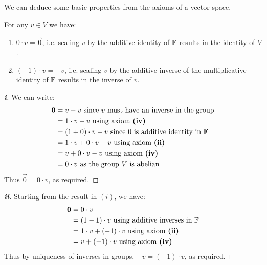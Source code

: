 \documentclass[../main.tex]{subfiles}
\begin{document}
We can deduce some basic properties from the axioms of a vector space.
\begin{proposition}
  For any $v \in V$ we have:
  \begin{enumerate}
    \item $0 \cdot v = \vec{0}$, i.e. scaling $v$ by the additive identity of $\mathbb{F}$ results in the identity of $V$.
    \item $(-1) \cdot v = -v$, i.e. scaling $v$ by the additive inverse of the multiplicative identity of $\mathbb{F}$ results in the inverse of $v$.
  \end{enumerate}
\end{proposition}
\begin{proof}[\textbf{i}]
  We can write:
  \begin{align*}
    \mathbf{\bm{0}} &= v - v \text{ since $v$ must have an inverse in the group}\\
            &= 1 \cdot v - v \text{ using axiom \textbf{(iv)}}\\
            &= (1 + 0) \cdot v - v \text{ since $0$ is additive identity in $\mathbb{F}$} \\
            &= 1 \cdot v + 0 \cdot v - v \text{ using axiom \textbf{(ii)}}\\
            &= v + 0 \cdot v - v \text{ using axiom \textbf{(iv)}}\\
            &= 0 \cdot v \text{ as the group $V$ is abelian}
  \end{align*}
  Thus $\vec{0} = 0 \cdot v$, as required.
\end{proof}
\begin{proof}[\textbf{ii}]
  Starting from the result in $(i)$, we have:
  \begin{align*}
    \mathbf{\bm{0}} &= 0 \cdot v \\
            &= (1 - 1) \cdot v \text{ using additive inverses in $\mathbb{F}$}\\
            &= 1 \cdot v + (-1) \cdot v \text{ using axiom \textbf{(ii)}}\\
            &= v + (-1) \cdot v \text{ using axiom \textbf{(iv)}}
  \end{align*}
  Thus by uniqueness of inverses in groups, $-v = (-1) \cdot v$, as required.
\end{proof}
\end{document}
